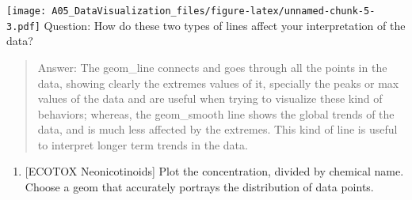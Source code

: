 \documentclass[]{article}
\providecommand{\tightlist}{%
  \setlength{\itemsep}{0pt}\setlength{\parskip}{0pt}}
\begin{document}
\texttt{[image: A05\_DataVisualization\_files/figure-latex/unnamed-chunk-5-3.pdf]}
Question: How do these two types of lines affect your interpretation of
the data?

\begin{quote}
Answer: The geom\_line connects and goes through all the points in the
data, showing clearly the extremes values of it, specially the peaks or
max values of the data and are useful when trying to visualize these
kind of behaviors; whereas, the geom\_smooth line shows the global
trends of the data, and is much less affected by the extremes. This kind
of line is useful to interpret longer term trends in the data.
\end{quote}

\begin{enumerate}
\def\labelenumi{\arabic{enumi}.}
\setcounter{enumi}{6}
\tightlist
\item
  {[}ECOTOX Neonicotinoids{]} Plot the concentration, divided by
  chemical name. Choose a geom that accurately portrays the distribution
  of data points.
\end{enumerate}
\end{document}

